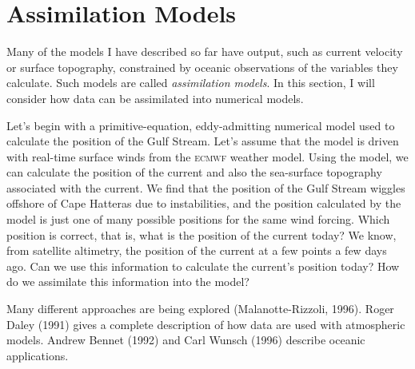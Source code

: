 \section{Assimilation Models}
Many of the models I have described so far have output, such as
current velocity or surface topography, constrained by oceanic
observations of the variables they calculate. Such models are called
\textit{assimilation models}. In this
section, I will consider how data can be assimilated into numerical
models.

Let's begin with a primitive-equation, eddy-admitting numerical model
used to calculate the position of the Gulf Stream. Let's assume that the model is driven with
real-time surface winds from the \textsc{ecmwf} weather model. Using
the model, we can calculate the position of the current and also the
sea-surface topography associated with the current.  We find that the
position of the Gulf Stream wiggles
offshore of Cape Hatteras due to instabilities, and the position
calculated by the model is just one of many possible positions for the
same wind forcing. Which position is correct, that is, what is the
position of the current today? We know, from satellite altimetry, the
position of the current at a few points a few days ago. Can we use
this information to calculate the current's position today? How do we
assimilate this information into the model?

Many different approaches are being explored (Malanotte-Rizzoli,
1996). Roger Daley (1991) gives a complete description of how data are
used with atmospheric models. Andrew Bennet (1992) and Carl Wunsch
(1996) describe oceanic applications.

